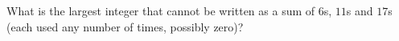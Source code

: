 What is the largest integer that cannot be written as a sum of $6$s, $11$s and $17$s (each used any number of times, possibly zero)?
